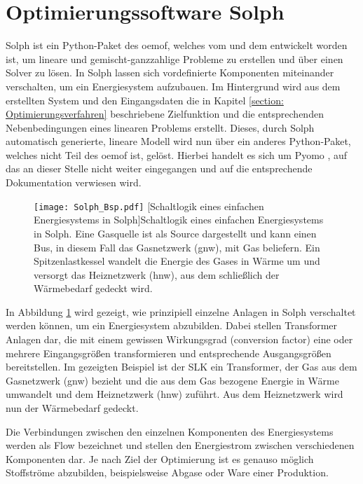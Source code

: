 \section{Optimierungssoftware Solph}\label{section: Solph}
Solph ist ein Python-Paket des \acf{oemof}, welches vom \citet{RLI2019} und dem \citet{ZNES2019} entwickelt worden ist, um lineare und gemischt-ganzzahlige Probleme zu erstellen und über einen Solver zu lösen. In Solph lassen sich vordefinierte Komponenten miteinander verschalten, um ein Energiesystem aufzubauen. Im Hintergrund wird aus dem erstellten System und den Eingangsdaten die in Kapitel \ref{section: Optimierungsverfahren} beschriebene Zielfunktion und die entsprechenden Nebenbedingungen eines linearen Problems erstellt. Dieses, durch Solph automatisch generierte, lineare Modell wird nun über ein anderes Python-Paket, welches nicht Teil des \acl{oemof} ist, gelöst. Hierbei handelt es sich um Pyomo \cite{hart2017pyomo}, auf das an dieser Stelle nicht weiter eingegangen und auf die entsprechende Dokumentation verwiesen wird. 
	\begin{figure}[ht]
		\centering
		\texttt{[image: Solph\_Bsp.pdf]}
		[Schaltlogik eines einfachen Energiesystems in Solph]{Schaltlogik eines einfachen Energiesystems in Solph. Eine Gasquelle ist als Source dargestellt und kann einen Bus, in diesem Fall das Gasnetzwerk (gnw), mit Gas beliefern. Ein Spitzenlastkessel wandelt die Energie des Gases in Wärme um und versorgt das Heiznetzwerk (hnw), aus dem schließlich der Wärmebedarf gedeckt wird.}
		\label{fig: BSP in Solph}
	\end{figure}

In Abbildung \ref{fig: BSP in Solph} wird gezeigt, wie prinzipiell einzelne Anlagen in Solph verschaltet werden können, um ein Energiesystem abzubilden. Dabei stellen Transformer Anlagen dar, die mit einem gewissen Wirkungsgrad (conversion factor) eine oder mehrere Eingangsgrößen transformieren und entsprechende Ausgangsgrößen bereitstellen. Im gezeigten Beispiel ist der \ac{SLK} ein Transformer, der Gas aus dem Gasnetzwerk (gnw) bezieht und die aus dem Gas bezogene Energie in Wärme umwandelt und dem Heiznetzwerk (hnw) zuführt. Aus dem Heiznetzwerk wird nun der Wärmebedarf gedeckt.

Die Verbindungen zwischen den einzelnen Komponenten des Energiesystems werden als Flow bezeichnet und stellen den Energiestrom zwischen verschiedenen Komponenten dar. Je nach Ziel der Optimierung ist es genauso möglich Stoffströme abzubilden, beispielsweise Abgase oder Ware einer Produktion.

